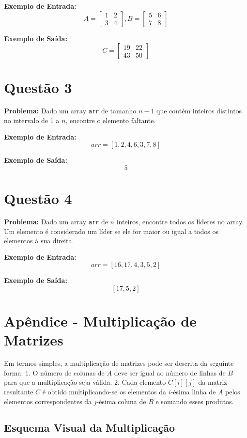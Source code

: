 \documentclass[12pt]{article}
\begin{document}
\textbf{Exemplo de Entrada:}
\[
A = \begin{bmatrix}
1 & 2 \\
3 & 4
\end{bmatrix},
B = \begin{bmatrix}
5 & 6 \\
7 & 8
\end{bmatrix}
\]

\textbf{Exemplo de Saída:}
\[
C = \begin{bmatrix}
19 & 22 \\
43 & 50
\end{bmatrix}
\]

\section*{Questão 3}
\textbf{Problema:} Dado um array \texttt{arr} de tamanho \(n-1\) que contém inteiros distintos no intervalo de 1 a \(n\), encontre o elemento faltante.

\textbf{Exemplo de Entrada:}
\[
arr = [1, 2, 4, 6, 3, 7, 8]
\]

\textbf{Exemplo de Saída:}
\[
5
\]


\section*{Questão 4}
\textbf{Problema:} Dado um array \texttt{arr} de \(n\) inteiros, encontre todos os líderes no array. Um elemento é considerado um líder se ele for maior ou igual a todos os elementos à sua direita.

\textbf{Exemplo de Entrada:}
\[
arr = [16, 17, 4, 3, 5, 2]
\]

\textbf{Exemplo de Saída:}
\[
[17, 5, 2]
\]


\appendix

\section{Apêndice - Multiplicação de Matrizes}


Em termos simples, a multiplicação de matrizes pode ser descrita da seguinte forma:
1. O número de colunas de \(A\) deve ser igual ao número de linhas de \(B\) para que a multiplicação seja válida.
2. Cada elemento \(C[i][j]\) da matriz resultante \(C\) é obtido multiplicando-se os elementos da \(i\)-ésima linha de \(A\) pelos elementos correspondentes da \(j\)-ésima coluna de \(B\) e somando esses produtos.

\subsection{Esquema Visual da Multiplicação}
\end{document}
